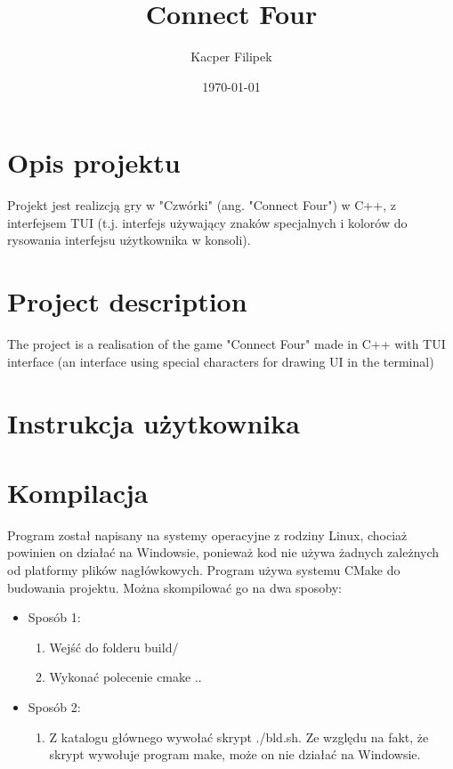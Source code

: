 \documentclass{article}
\title{Connect Four}
\author{Kacper Filipek}
\date{\today}
\begin{document}
\selectfont

\maketitle

\newpage

\section{Opis projektu}

Projekt jest realizcją gry w "Czwórki" (ang. "Connect Four") w C++, z interfejsem TUI (t.j. interfejs używający znaków specjalnych i kolorów do rysowania interfejsu użytkownika w konsoli). 

\section{Project description}

The project is a realisation of the game "Connect Four" made in C++ with TUI interface (an interface using special characters for drawing UI in the terminal)

\section{Instrukcja użytkownika}

\section{Kompilacja}

Program został napisany na systemy operacyjne z rodziny Linux, 
chociaż powinien on działać na Windowsie, ponieważ kod nie 
używa żadnych zależnych od platformy plików nagłówkowych. 
Program używa  systemu CMake do budowania projektu. 
Można skompilować go na dwa sposoby:
    \begin{itemize}
         
    \item Sposób 1:
        \begin{enumerate}
            \item Wejść do folderu build/
            \item Wykonać polecenie cmake ..
        \end{enumerate}

    \item Sposób 2:
        \begin{enumerate}
            \item Z katalogu głównego wywołać skrypt ./bld.sh. Ze względu na fakt, że skrypt wywołuje program make, może on nie działać na Windowsie.
        \end{enumerate}

    \end{itemize}
\end{document}
